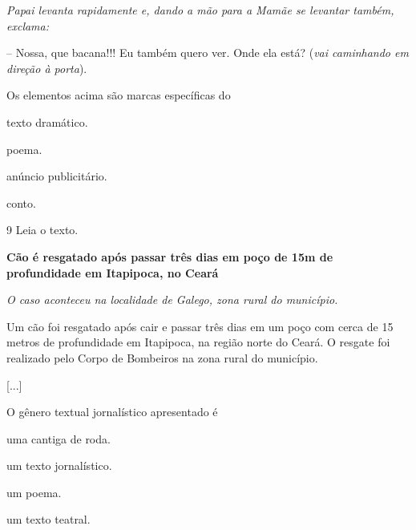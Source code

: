 \begin{myquote}
\textit{Papai levanta rapidamente e, dando a mão para a Mamãe se levantar
também, exclama:} 

-- Nossa, que bacana!!! Eu também quero ver. Onde ela
está? (\textit{vai caminhando em direção à porta}).

\end{myquote}

Os elementos acima são marcas específicas do

\begin{escolha}
\begin{multicols}{2}
\item texto dramático.

\item poema.

\item anúncio publicitário.

\item conto.
\end{multicols}
\end{escolha}

\num{9} Leia o texto.

\begin{myquote}
\textbf{Cão é resgatado após passar três dias em poço de 15m de profundidade em Itapipoca, no Ceará}

\emph{O caso aconteceu na localidade de Galego, zona rural do município.}

Um cão foi resgatado após cair e passar três dias em um poço com cerca
de 15 metros de profundidade em Itapipoca, na região norte do Ceará. 
O resgate foi realizado pelo Corpo de Bombeiros na zona rural do município.

{[}...{]}

\end{myquote}

O gênero textual jornalístico apresentado é

\begin{escolha}
\item uma cantiga de roda.

\item um texto jornalístico.

\item um poema.

\item um texto teatral.
\end{escolha}

